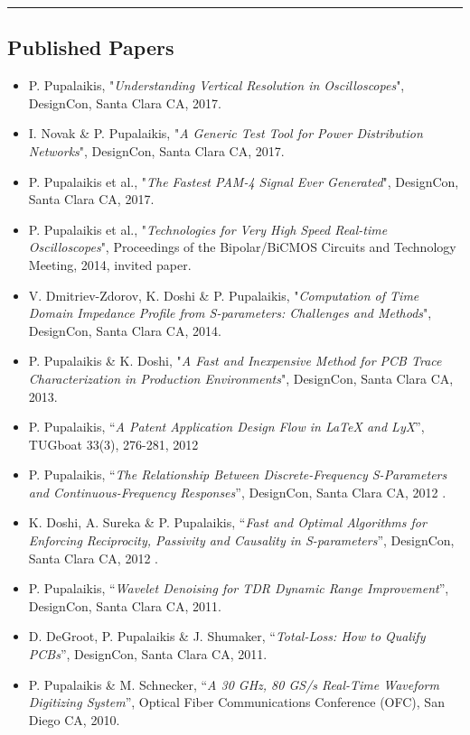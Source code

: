 \documentclass[10pt,letterpaper]{extarticle}
\newenvironment{indentsection}[1]%
{\begin{list}{}%
	{\setlength{\leftmargin}{#1}}%
	\item[]%
}
{\end{list}}
\begin{document}
\vspace{0.2em}
\hrule
\vspace{-1em}\subsection*{\Large Published Papers}\vspace{-0.5em}
\begin{indentsection}{-1em}\begin{itemize}
\parskip=-0.2em
\item P. Pupalaikis, "\emph{Understanding Vertical Resolution in Oscilloscopes}", DesignCon, Santa Clara CA, 2017.
\item I. Novak \& P. Pupalaikis, "\emph{A Generic Test Tool for Power Distribution Networks}", DesignCon, Santa Clara CA, 2017.
\item P. Pupalaikis et al., "\emph{The Fastest PAM-4 Signal Ever Generated}", DesignCon, Santa Clara CA, 2017.
\item P. Pupalaikis et al., "\emph{Technologies for Very High Speed Real-time Oscilloscopes}", Proceedings of the Bipolar/BiCMOS Circuits and Technology Meeting, 2014, invited paper.
\item  V. Dmitriev-Zdorov, K. Doshi \& P. Pupalaikis, "\emph{Computation of Time Domain Impedance Profile from S-parameters: Challenges and Methods}", DesignCon, Santa Clara CA, 2014.
\item P. Pupalaikis \& K. Doshi, "\emph{A Fast and Inexpensive Method for PCB Trace Characterization in Production Environments}", DesignCon, Santa Clara CA, 2013.
\item P. Pupalaikis, “\emph{A Patent Application Design Flow in LaTeX and LyX}”, TUGboat 33(3), 276-281, 2012
\item P. Pupalaikis, “\emph{The Relationship Between Discrete-Frequency S-Parameters and Continuous-Frequency Responses}”, DesignCon, Santa Clara CA, 2012 .
\item K. Doshi, A. Sureka \& P. Pupalaikis, “\emph{Fast and Optimal Algorithms for Enforcing Reciprocity, Passivity and Causality in S-parameters}”, DesignCon, Santa Clara CA, 2012 .
\item P. Pupalaikis, “\emph{Wavelet Denoising for TDR Dynamic Range Improvement}”, DesignCon, Santa Clara CA, 2011.
\item D. DeGroot, P. Pupalaikis \& J. Shumaker, “\emph{Total-Loss: How to Qualify PCBs}”, DesignCon, Santa Clara CA, 2011. 
\item P. Pupalaikis \& M. Schnecker, “\emph{A 30 GHz, 80 GS/s Real-Time Waveform Digitizing System}”, Optical Fiber Communications Conference (OFC), San Diego CA, 2010. 

\end{itemize}
\end{indentsection}
\end{document}
